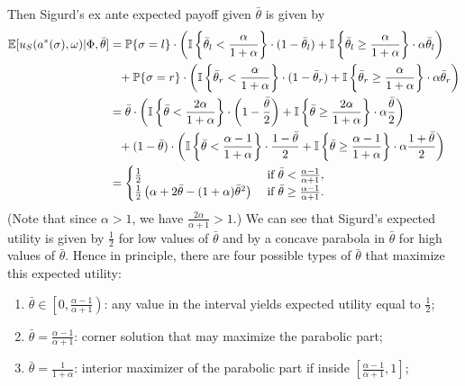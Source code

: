 \documentclass[a4paper]{article}
\begin{document}
\begin{enumerate}
	Then Sigurd's ex ante expected payoff given $\bar{\theta}$ is given by
	\begin{align*}
		\mathbb{E}[u_S(a^*(\sigma), \omega) | \Phi,\bar{\theta}]
		&= \mathbb{P}\{\sigma=l\} \cdot \left( \mathbb{I} \left\{ \bar{\theta}_l < \frac{\alpha}{1+\alpha} \right\} \cdot (1-\bar{\theta}_l)
		+ \mathbb{I} \left\{ \bar{\theta}_l \geq \frac{\alpha}{1+\alpha} \right\} \cdot \alpha \bar{\theta}_l \right) 
		\\
		&\hphantom{=} + \mathbb{P}\{\sigma=r\} \cdot \left( \mathbb{I} \left\{ \bar{\theta}_r < \frac{\alpha}{1+\alpha} \right\} \cdot (1-\bar{\theta}_r)
		+ \mathbb{I} \left\{ \bar{\theta}_r \geq \frac{\alpha}{1+\alpha} \right\} \cdot \alpha \bar{\theta}_r \right) 
		\\
		&= \bar{\theta} \cdot \left( \mathbb{I} \left\{ \bar{\theta} < \frac{2\alpha}{1+\alpha} \right\} \cdot \left( 1-\frac{\bar{\theta}}{2} \right)
		+ \mathbb{I} \left\{ \bar{\theta} \geq \frac{2\alpha}{1+\alpha} \right\} \cdot \alpha \frac{\bar{\theta}}{2} \right) 
		\\
		&\hphantom{=} + (1-\bar{\theta}) \cdot \left( \mathbb{I} \left\{ \bar{\theta} < \frac{\alpha-1}{1+\alpha} \right\} \cdot \frac{1-\bar{\theta}}{2} 
		+ \mathbb{I} \left\{ \bar{\theta} \geq \frac{\alpha-1}{1+\alpha} \right\} \cdot \alpha \frac{1+\bar{\theta}}{2} \right) 
		\\
		&= \begin{cases}
			\frac{1}{2} & \text{ if } \bar{\theta} < \frac{\alpha-1}{\alpha+1},
			\\
			\frac{1}{2} \left(\alpha + 2 \bar{\theta} - (1+\alpha) \bar{\theta}^2\right) & \text{ if } \bar{\theta} \geq \frac{\alpha-1}{\alpha+1}.
		\end{cases}
	\end{align*}
	(Note that since $\alpha>1$, we have $\frac{2\alpha}{\alpha+1}>1$.)
	We can see that Sigurd's expected utility is given by $\frac{1}{2}$ for low values of $\bar{\theta}$ and by a concave parabola in $\bar{\theta}$ for high values of $\bar{\theta}$. Hence in principle, there are four possible types of $\bar{\theta}$ that maximize this expected utility:
	\begin{enumerate}
		\item $\bar{\theta} \in \left[ 0, \frac{\alpha-1}{\alpha+1} \right)$: any value in the interval yields expected utility equal to $\frac{1}{2}$;
		\item $\bar{\theta} = \frac{\alpha-1}{\alpha+1}$: corner solution that may maximize the parabolic part;
		\item $\bar{\theta} = \frac{1}{1+\alpha}$: interior maximizer of the parabolic part if inside $\left[ \frac{\alpha-1}{\alpha+1}, 1 \right]$;

\end{enumerate}
\end{enumerate}
\end{document}
